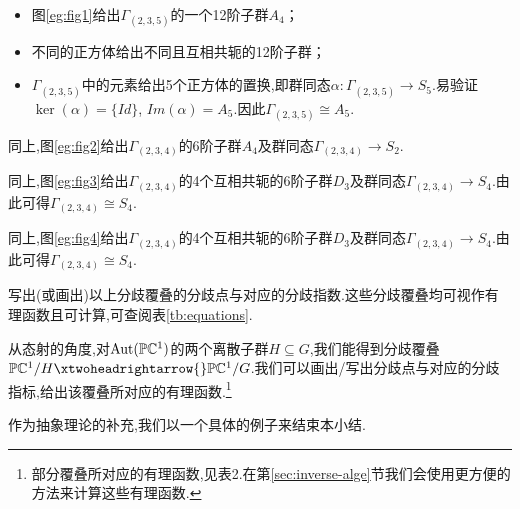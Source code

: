 \begin{example1}\
		\begin{itemize}
			\item 图\ref{eg:fig1}给出$\Gamma_{(2,3,5)}$的一个12阶子群$A_4$；
			
			\item 不同的正方体给出不同且互相共轭的12阶子群；
			
			\item $\Gamma_{(2,3,5)}$中的元素给出5个正方体的置换,即群同态$\alpha:\Gamma_{(2,3,5)}\longrightarrow S_5$.易验证$\ker(\alpha)=\{Id\}$, $Im(\alpha)=A_5$.因此$\Gamma_{(2,3,5)}\cong A_5$.
			
		\end{itemize}
	
\end{example1}
\begin{example1}
		同上,图\ref{eg:fig2}给出$\Gamma_{(2,3,4)}$的6阶子群$A_4$及群同态$\Gamma_{(2,3,4)}\longrightarrow S_2$.
\end{example1}
\begin{example1}		
		同上,图\ref{eg:fig3}给出$\Gamma_{(2,3,4)}$的4个互相共轭的6阶子群$D_3$及群同态$\Gamma_{(2,3,4)}\longrightarrow S_4$.由此可得$\Gamma_{(2,3,4)}\cong S_4$.
\end{example1}
\begin{example1}
		同上,图\ref{eg:fig4}给出$\Gamma_{(2,3,4)}$的4个互相共轭的6阶子群$D_3$及群同态$\Gamma_{(2,3,4)}\longrightarrow S_4$.由此可得$\Gamma_{(2,3,4)}\cong S_4$.
\end{example1}


\begin{exercise}
	写出(或画出)以上分歧覆叠的分歧点与对应的分歧指数.这些分歧覆叠均可视作有理函数且可计算,可查阅表\ref{tb:equations}.
\end{exercise}

从态射的角度,对$\operatorname{Aut} (\mathbb{P}\mathbb{C}^1)$的两个离散子群$H \subseteq G$,我们能得到分歧覆叠$\mathbb{P}\mathbb{C}^1/H \xtwoheadrightarrow{} \mathbb{P}\mathbb{C}^1/G$.我们可以画出/写出分歧点与对应的分歧指标,给出该覆叠所对应的有理函数.\footnote{部分覆叠所对应的有理函数,见表2.在第\ref{sec:inverse-alge}节我们会使用更方便的方法来计算这些有理函数.}

作为抽象理论的补充,我们以一个具体的例子来结束本小结.

